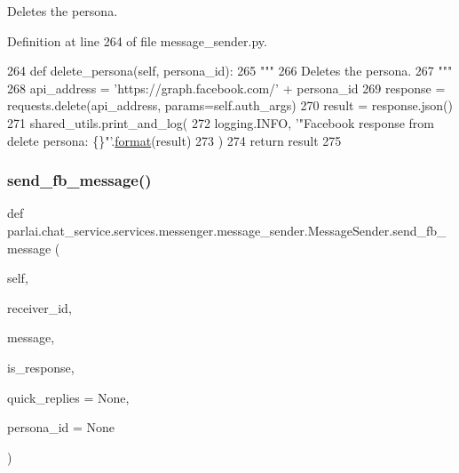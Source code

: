 \begin{DoxyVerb}Deletes the persona.
\end{DoxyVerb}
 

Definition at line 264 of file message\+\_\+sender.\+py.


\begin{DoxyCode}
264     \textcolor{keyword}{def }delete\_persona(self, persona\_id):
265         \textcolor{stringliteral}{"""}
266 \textcolor{stringliteral}{        Deletes the persona.}
267 \textcolor{stringliteral}{        """}
268         api\_address = \textcolor{stringliteral}{'https://graph.facebook.com/'} + persona\_id
269         response = requests.delete(api\_address, params=self.auth\_args)
270         result = response.json()
271         shared\_utils.print\_and\_log(
272             logging.INFO, \textcolor{stringliteral}{'"Facebook response from delete persona: \{\}"'}.\hyperlink{namespaceparlai_1_1chat__service_1_1services_1_1messenger_1_1shared__utils_a32e2e2022b824fbaf80c747160b52a76}{format}(result)
273         )
274         \textcolor{keywordflow}{return} result
275 
\end{DoxyCode}
\mbox{\label{classparlai_1_1chat__service_1_1services_1_1messenger_1_1message__sender_1_1MessageSender_af4854bc64730dc49290816a6d3da2541}} 
\subsubsection{\texorpdfstring{send\+\_\+fb\+\_\+message()}{send\_fb\_message()}}
{\footnotesize\ttfamily def parlai.\+chat\+\_\+service.\+services.\+messenger.\+message\+\_\+sender.\+Message\+Sender.\+send\+\_\+fb\+\_\+message (\begin{DoxyParamCaption}\item[{}]{self,  }\item[{}]{receiver\+\_\+id,  }\item[{}]{message,  }\item[{}]{is\+\_\+response,  }\item[{}]{quick\+\_\+replies = {\ttfamily None},  }\item[{}]{persona\+\_\+id = {\ttfamily None} }\end{DoxyParamCaption})}

